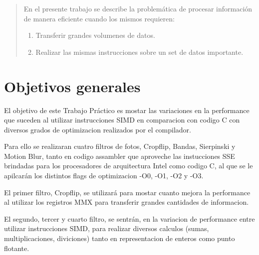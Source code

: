 \documentclass[a4paper]{article}
\begin{document}
\thispagestyle{empty}

\maketitle
\newpage

\thispagestyle{empty}
\vfill
\begin{abstract}
En el presente trabajo se describe la problemática de procesar información de manera eficiente cuando los mismos requieren:
\begin{enumerate}
\item Transferir grandes volumenes de datos.
\item Realizar las mismas instrucciones sobre un set de datos importante.
\end{enumerate}

\end{abstract}

\thispagestyle{empty}
\vspace{3cm}
\tableofcontents
\newpage

\newpage

\section{Objetivos generales}

El objetivo de este Trabajo Práctico es mostar las variaciones en la performance que suceden al utilizar instrucciones SIMD en comparacion con codigo C con diversos grados de optimizacion realizados por el compilador.

Para ello se realizaran cuatro filtros de fotos, Cropflip, Bandas, Sierpinski y Motion Blur, tanto en codigo assambler que aproveche las instucciones SSE brindadas para los procesadores de arquitectura Intel como codigo C, al que se le apilcarán los distintos flags de optimizacion -O0, -O1, -O2 y -O3.

El primer filtro, Cropflip, se utilizará para mostar cuanto mejora la performance al utilizar los registros MMX para transferir grandes cantidades de informacion.

El segundo, tercer y cuarto filtro, se sentrán, en la variacion de performance entre utilizar instrucciones SIMD, para realizar diversos calculos (sumas, multiplicaciones, diviciones) tanto en representacion de enteros como punto flotante.
\end{document}
